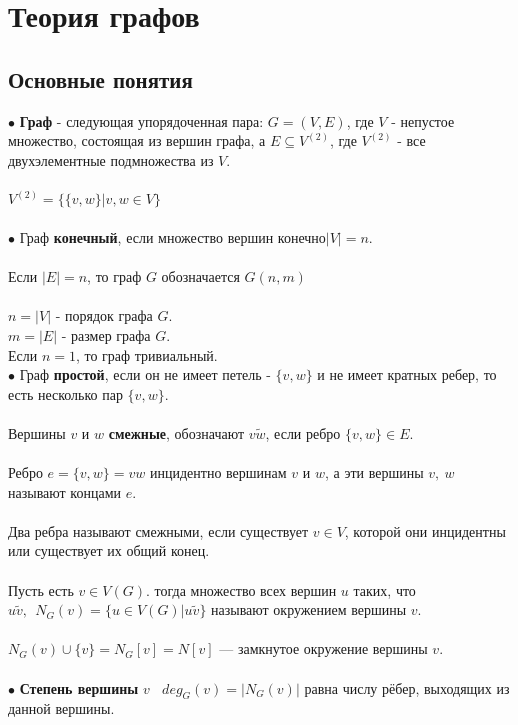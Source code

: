 \documentclass[a4paper, 12pt]{report}
\begin{document}
\chapter{Теория графов} %
\section*{Основные понятия}

$\bullet$ \textbf{Граф} - следующая упорядоченная пара: $G = (V, E)$, где $V$ - непустое множество, состоящая из вершин графа, а $E \subseteq V^{(2)}$, где $V^{(2)}$ - все двухэлементные подмножества из $V$.\\\\
$V^{(2)} = \{ \{v, w \} | v, w \in V \}$\\\\

$\bullet$ Граф \textbf{конечный}, если множество вершин конечно$|V| = n$. \\\\
Если $|E|=n$, то граф $G$ обозначается $G(n,m)$ \\\\
$n=|V|$ - порядок графа $G$.\\
$m=|E|$ - размер графа $G$.\\
Если $n=1$, то граф тривиальный. \\
$\bullet$ Граф \textbf{простой}, если он не имеет петель - $\{v, w\}$ и не имеет кратных ребер, то есть несколько пар $\{v, w\}$.\\\\
Вершины $v$ и $w$ \textbf{смежные}, обозначают $v\tilde w$, если ребро $\{v, w\} \in E$.\\\\
Ребро $e=\{v, w\}=vw$ инцидентно вершинам $v$ и $w$, а эти вершины $v,~w$ называют концами $e$.\\\\
Два ребра называют смежными, если существует $ v \in V $, которой они инцидентны или существует их общий конец.\\\\
Пусть есть $v \in V(G)$. тогда множество всех  вершин $u$ таких, что $u \tilde v, ~~ N_G(v)= \{u \in V(G)|u\tilde v\}$ называют окружением вершины $v$.\\\\
$N_G(v) \cup \{ v \} = N_G [ v ] = N[v]$  — замкнутое окружение вершины $v$. \\\\

$\bullet$ \textbf{Степень вершины} $ v ~~~~ deg_G(v) = |N_G(v)|$ равна числу рёбер, выходящих из данной вершины.\\\\
\end{document}
